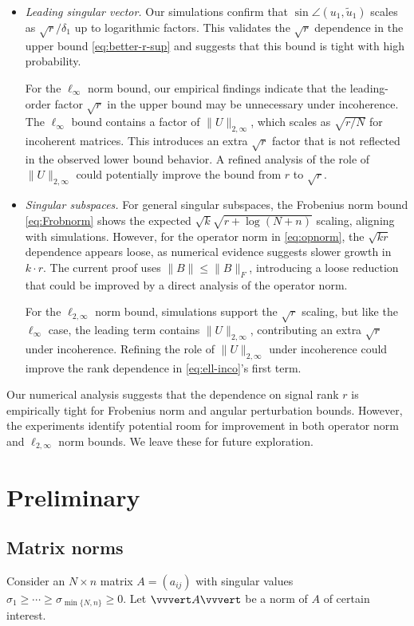 \documentclass[reqno]{amsart}
\newcommand{\T}{\mathrm{T}}
\theoremstyle{plain}
\theoremstyle{definition}
\begin{document}
\begin{itemize}
    \item \textit{Leading singular vector.} Our simulations confirm that $\sin \angle(u_1, \widetilde{u}_1)$ scales as $\sqrt{r}/\delta_1$ up to logarithmic factors. This validates the $\sqrt{r}$ dependence in the upper bound \eqref{eq:better-r-sup} and suggests that this bound is tight with high probability.
    

    For the $\ell_\infty$ norm bound, our empirical findings indicate that the leading-order factor \(\sqrt{r}\) in the upper bound may be unnecessary under incoherence. The $\ell_{\infty}$ bound contains a factor of $\|U\|_{2,\infty}$, which scales as $\sqrt{r/N}$ for incoherent matrices. This introduces an extra $\sqrt{r}$ factor that is not reflected in the observed lower bound behavior. A refined analysis of the role of $\|U\|_{2,\infty}$ could potentially improve the bound from $r$ to $\sqrt{r}$.
   \smallskip 
   
    \item \textit{Singular subspaces.} For general singular subspaces, the Frobenius norm bound \eqref{eq:Frobnorm} shows the expected $\sqrt{k}\sqrt{r + \log(N+n)}$ scaling, aligning with simulations. However, for the operator norm in \eqref{eq:opnorm}, the $\sqrt{k r}$ dependence appears loose, as numerical evidence suggests slower growth in $k\cdot r$. The current proof uses $\|B\| \leq \|B\|_F$, introducing a loose reduction that could be improved by a direct analysis of the operator norm.

For the $\ell_{2,\infty}$ norm bound, simulations support the \(\sqrt{r}\) scaling, but like the $\ell_\infty$ case, the leading term contains $\|U\|_{2,\infty}$, contributing an extra $\sqrt{r}$ under incoherence. Refining the role of $\|U\|_{2,\infty}$ under incoherence could improve the rank dependence in \eqref{eq:ell-inco}'s first term. 
\end{itemize}

Our numerical analysis suggests that the dependence on signal rank $r$ is empirically tight for Frobenius norm and angular perturbation bounds. However, the experiments identify potential room for improvement in both operator norm and $\ell_{2,\infty}$ norm bounds. We leave these for future exploration. 


\section{Preliminary}\label{sec:basic1}
\subsection{Matrix norms}\label{sec:matrixnorms}
Consider an $N \times n$ matrix $A=(a_{ij})$ with singular values $\sigma_1\ge \cdots \ge \sigma_{\min\{N,n\}}\ge 0$. Let $\vvvert A\vvvert $ be a norm of $A$ of certain interest. %
\end{document}
